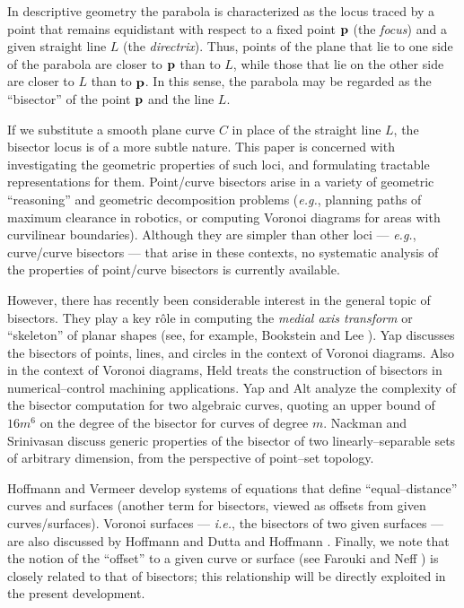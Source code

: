 In descriptive geometry \cite{coxeter69} the parabola is
characterized as the locus traced by a point that remains
equidistant with respect to a fixed point ${\bf p}$ (the
{\it focus\/}) and a given straight line $L$ (the {\it
directrix\/}). Thus, points of the plane that lie to one
side of the parabola are closer to ${\bf p}$ than to $L$,
while those that lie on the other side are closer to $L$
than to ${\bf p}$. In this sense, the parabola may be
regarded as the ``bisector'' of the point ${\bf p}$ and
the line $L$.

If we substitute a smooth plane curve $C$ in place of the
straight line $L$, the bisector locus is of a more subtle
nature. This paper is concerned with investigating the
geometric properties of such loci, and formulating tractable
representations for them. Point/curve bisectors arise in a
variety of geometric ``reasoning'' and geometric decomposition
problems ({\it e.g.}, planning paths of maximum clearance
in robotics, or computing Voronoi diagrams for areas with
curvilinear boundaries). Although they are simpler than
other loci --- {\it e.g.}, curve/curve bisectors --- that
arise in these contexts, no systematic analysis of the
properties of point/curve bisectors is currently available.

However, there has recently been considerable interest in
the general topic of bisectors. They play a key r\^ole in
computing the {\it medial axis transform\/} or ``skeleton''
of planar shapes (see, for example, Bookstein \cite{bookstein79}
and Lee \cite{lee82}). Yap \cite{yap87} discusses the bisectors
of points, lines, and circles in the context of Voronoi diagrams.
Also in the context of Voronoi diagrams, Held \cite{Held91}
treats the construction of bisectors in numerical--control
machining applications. Yap and Alt \cite{yap89} analyze
the complexity of the bisector computation for two algebraic
curves, quoting an upper bound of $16m^6$ on the degree of
the bisector for curves of degree $m$. Nackman and Srinivasan
\cite{nackman91} discuss generic properties of the bisector of
two linearly--separable sets of arbitrary dimension, from the
perspective of point--set topology.

Hoffmann and Vermeer \cite{HV91} develop systems of equations
that define ``equal--distance'' curves and surfaces (another
term for bisectors, viewed as offsets from given curves/surfaces).
Voronoi surfaces --- {\it i.e.}, the bisectors of two given
surfaces --- are also discussed by Hoffmann \cite{H90} and Dutta
and Hoffmann \cite{DH90}. Finally, we note that the notion of
the ``offset'' to a given curve or surface (see Farouki and Neff
\cite{farouki90}) is closely related to that of bisectors; this
relationship will be directly exploited in the present development.

